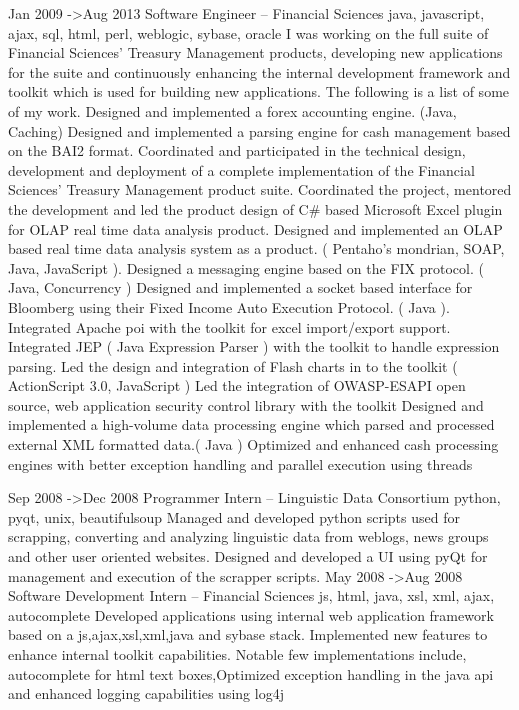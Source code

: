 \documentclass{article}
\begin{document}
Jan 2009 ->Aug 2013 Software Engineer – Financial Sciences
java, javascript, ajax, sql, html, perl, weblogic, sybase, oracle
I was working on the full suite of Financial Sciences' Treasury Management products, developing new applications for the suite and continuously enhancing the
internal development framework and toolkit which is used for building new applications. The following is a list of some of my work.
Designed and implemented a forex accounting engine. (Java, Caching)
Designed and implemented a parsing engine for cash management based on the BAI2 format.
Coordinated and participated in the technical design, development and deployment of a complete implementation of the Financial Sciences' Treasury
Management product suite.
Coordinated the project, mentored the development and led the product design of C\# based Microsoft Excel plugin for OLAP real time data analysis
product.
Designed and implemented an OLAP based real time data analysis system as a product. ( Pentaho's mondrian, SOAP, Java, JavaScript ).
Designed a messaging engine based on the FIX protocol. ( Java, Concurrency )
Designed and implemented a socket based interface for Bloomberg using their Fixed Income Auto Execution Protocol. ( Java ).
Integrated Apache poi with the toolkit for excel import/export support.
Integrated JEP ( Java Expression Parser ) with the toolkit to handle expression parsing.
Led the design and integration of Flash charts in to the toolkit ( ActionScript 3.0, JavaScript )
Led the integration of OWASP-ESAPI open source, web application security control library with the toolkit
Designed and implemented a high-volume data processing engine which parsed and processed external XML formatted data.( Java )
Optimized and enhanced cash processing engines with better exception handling and parallel execution using threads


Sep 2008 ->Dec 2008 Programmer Intern – Linguistic Data Consortium
python, pyqt, unix, beautifulsoup
Managed and developed python scripts used for scrapping, converting and analyzing linguistic data from weblogs, news groups and other user oriented
websites.
Designed and developed a UI using pyQt for management and execution of the scrapper scripts.
May 2008 ->Aug 2008 Software Development Intern – Financial Sciences
js, html, java, xsl, xml, ajax, autocomplete
Developed applications using internal web application framework based on a js,ajax,xsl,xml,java and sybase stack.
Implemented new features to enhance internal toolkit capabilities. Notable few implementations include, autocomplete for html text boxes,Optimized
exception handling in the java api and enhanced logging capabilities using log4j
\end{document}
